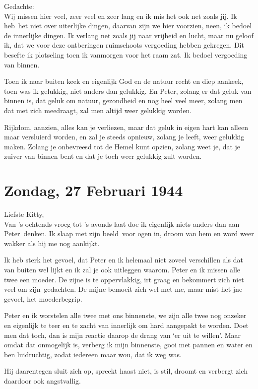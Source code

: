 \documentclass{book}
\begin{document}
Gedachte:\\Wij missen hier veel, zeer veel en zeer lang en ik mis het
ook net zoals jij. Ik heb~het niet over uiterlijke dingen, daarvan zijn
we hier voorzien, neen, ik bedoel de innerlijke dingen. Ik verlang net
zoals jij naar vrijheid en lucht, maar nu geloof ik, dat we voor deze
ontberingen ruimschoots vergoeding hebben gekregen. Dit besefte ik
plotseling toen ik vanmorgen voor het raam zat. Ik bedoel vergoeding van
binnen.

Toen ik naar buiten keek en eigenlijk God en de natuur recht en diep
aankeek, toen was ik gelukkig, niet anders dan gelukkig. En Peter,
zolang er dat geluk van binnen is, dat geluk om natuur, gezondheid en
nog heel veel meer, zolang men dat met zich meedraagt, zal men altijd
weer gelukkig worden.

Rijkdom, aanzien, alles kan je verliezen, maar dat geluk in eigen hart
kan alleen maar versluierd worden, en zal je steeds opnieuw, zolang je
leeft, weer gelukkig maken. Zolang je onbevreesd tot de Hemel kunt
opzien, zolang weet je, dat je zuiver van binnen bent en dat je toch
weer gelukkig zult worden.

\chapter{Zondag, 27 Februari 1944}

Liefste Kitty,\\Van 's ochtends vroeg tot 's avonds laat doe ik
eigenlijk niets anders dan aan Peter~denken. Ik slaap met zijn
beeld~voor ogen in, droom van hem en word weer wakker als hij me nog
aankijkt.

Ik heb sterk het gevoel, dat Peter en ik helemaal niet zoveel
verschillen als dat van buiten wel lijkt en ik zal je ook uitleggen
waarom. Peter en ik missen alle twee een moeder. De zijne is te
oppervlakkig, irt graag en bekommert zich niet veel om zijn~gedachten.
De mijne bemoeit zich wel met me, maar mist het jne gevoel, het
moederbegrip.

Peter en ik worstelen alle twee met ons binnenste, we zijn alle twee nog
onzeker en eigenlijk te teer en te zacht van innerlijk om hard aangepakt
te worden. Doet men dat toch, dan is mijn reactie daarop de drang van
`er uit te willen'. Maar omdat dat onmogelijk is, verberg ik mijn
binnenste, gooi met pannen en water en ben luidruchtig, zodat iedereen
maar wou, dat ik weg was.

Hij daarentegen sluit zich op, spreekt haast niet, is stil, droomt en
verbergt zich daardoor ook angstvallig.
\end{document}
